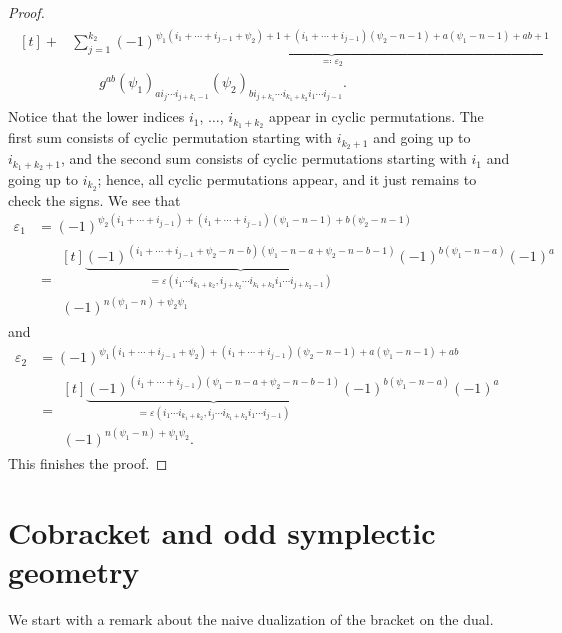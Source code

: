\documentclass[\MainFolder/Text.tex]{subfiles}
\begin{document}
\begin{proof}
\begin{align*}
\begin{aligned}[t]
{}+ & \sum_{j=1}^{k_2} \underbrace{(-1)^{\psi_1(i_1+\dotsb+i_{j-1} + \psi_2) + 1 + (i_1+\dotsb +i_{j-1})(\psi_2 - n - 1) + a(\psi_1-n - 1) + ab + 1}}_{\eqqcolon\varepsilon_2} \\ 
&\qquad g^{ab} (\psi_1)_{a i_j\dotsb i_{j+k_1-1}}
(\psi_2)_{b i_{j+k_1}\dotsb i_{k_1+k_2} i_1 \dotsb i_{j-1}}.
\end{aligned} 
\end{align*}
Notice that the lower indices $i_1$, $\dotsc$, $i_{k_1+k_2}$ appear in cyclic permutations. The first sum consists of cyclic permutation starting with $i_{k_2 + 1}$ and going up to $i_{k_1+k_2+1}$, and the second sum consists of cyclic permutations starting with $i_{1}$ and going up to $i_{k_2}$; hence, all cyclic permutations appear, and it just remains to check the signs. We see that
\begin{align*}
\varepsilon_1 &= (-1)^{\psi_2(i_1+\dotsb+i_{j-1}) + (i_1 + \dotsb + i_{j-1})(\psi_1-n-1) + b(\psi_2 -n- 1)}\\
&=\begin{multlined}[t]\underbrace{(-1)^{(i_1 + \dotsb + i_{j-1} + \psi_2 - n - b)(\psi_1 - n - a + \psi_2 - n - b - 1)}}_{=\varepsilon(i_1\dotsb i_{k_1+k_2}, i_{j+k_2} \dotsb i_{k_1+k_2} i_1 \dotsb i_{j+k_2-1})} (-1)^{b(\psi_1 -n- a)}(-1)^a \\ (-1)^{n(\psi_1 - n) + \psi_2 \psi_1}
\end{multlined}
\end{align*}
and
\begin{align*}
\varepsilon_2 &= (-1)^{\psi_1(i_1+\dotsb+i_{j-1} + \psi_2) + (i_1+\dotsb +i_{j-1})(\psi_2 - n - 1) + a(\psi_1-n-1) + a b} \\
& = \begin{multlined}[t]\underbrace{(-1)^{(i_1 + \dotsb + i_{j-1})(\psi_1 -n - a + \psi_2 -n- b - 1)}}_{=\varepsilon(i_1 \dotsb i_{k_1 + k_2}, i_j \dotsb i_{k_1+k_2} i_1 \dotsb i_{j-1})} (-1)^{b(\psi_1-n-a)}(-1)^a \\
(-1)^{n(\psi_1 - n) + \psi_1 \psi_2 }.
\end{multlined}
\end{align*}
This finishes the proof.
\end{proof}



\section{Cobracket and odd symplectic geometry}\label{Sec:CoprNic}

We start with a remark about the naive dualization of the bracket on the dual.
\end{document}

